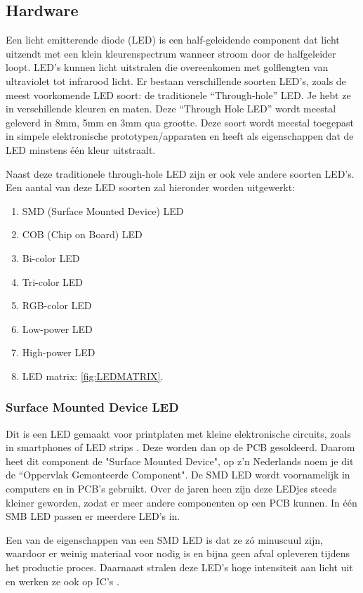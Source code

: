 \subsection{Hardware}
\label{subsec:methoden:hardware}
Een licht emitterende diode (LED) is een half-geleidende component dat licht uitzendt met een klein kleurenspectrum wanneer stroom door de halfgeleider loopt. 
LED's kunnen licht uitstralen die overeenkomen met golflengten van ultraviolet tot infrarood licht.
Er bestaan verschillende soorten LED's, zoals de meest voorkomende LED soort: de traditionele 
``Through-hole'' LED. Je hebt ze in verschillende kleuren en maten. Deze ``Through Hole LED'' wordt meestal 
geleverd in 8mm, 5mm en 3mm qua grootte. Deze soort wordt meestal toegepast in simpele elektronische prototypen/apparaten en heeft als eigenschappen dat de LED minstens één kleur uitstraalt.

Naast deze traditionele through-hole LED zijn er ook vele andere soorten LED's.
Een aantal van deze LED soorten zal hieronder worden uitgewerkt:
\begin{enumerate}
    \item SMD (Surface Mounted Device) LED
    \item COB (Chip on Board) LED
    \item Bi-color LED
    \item Tri-color LED
    \item RGB-color LED
    \item Low-power LED
    \item High-power LED
    \item LED matrix: \ref{fig:LEDMATRIX}.
\end{enumerate}
\vspace{0.5cm}
\subsubsection{Surface Mounted Device LED}
Dit is een LED gemaakt voor printplaten met kleine elektronische circuits, zoals in smartphones of LED strips \cite{35285050LEDs}. Deze worden dan op de PCB 
gesoldeerd. Daarom heet dit component de "Surface Mounted Device", op z'n Nederlands 
noem je dit de ``Oppervlak Gemonteerde Component". De SMD LED wordt voornamelijk in computers en in PCB's gebruikt. Over 
de jaren heen zijn deze LEDjes steeds kleiner geworden, zodat er meer andere componenten 
op een PCB kunnen. In één SMB LED passen er meerdere LED's in.

Een van de eigenschappen van een SMD LED is dat ze zó minuscuul zijn, waardoor er weinig materiaal voor nodig is en bijna geen afval 
opleveren tijdens het productie proces. Daarnaast stralen deze LED's hoge intensiteit aan licht uit en werken ze ook op IC's \cite{LTSTS326KGKFKT}.
\\
